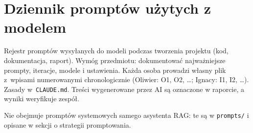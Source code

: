 \section{Dziennik promptów użytych z modelem}
\label{app:prompty}

Rejestr promptów wysyłanych do modeli podczas tworzenia projektu (kod, dokumentacja, raport).
Wymóg przedmiotu: dokumentować najważniejsze prompty, iteracje, modele i ustawienia. Każda
osoba prowadzi własny plik z~wpisami numerowanymi chronologicznie (Oliwier: O1, O2, \ldots;
Ignacy: I1, I2, \ldots). Zasady w~\texttt{CLAUDE.md}. Treści wygenerowane przez
AI są oznaczone w raporcie, a wyniki weryfikuje zespół.

Nie obejmuje promptów systemowych samego asystenta RAG: te są w \texttt{prompts/} i opisane w
sekcji o strategii promptowania.




